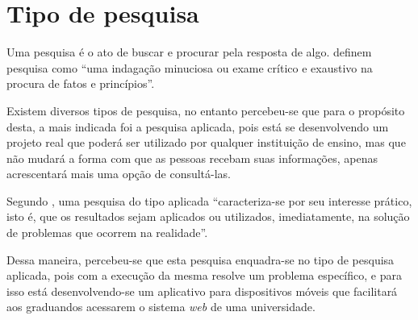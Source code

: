 \section{Tipo de pesquisa}
	
	\par Uma pesquisa é o ato de buscar e procurar pela resposta de algo.
 definem pesquisa como “uma indagação minuciosa
ou exame crítico e exaustivo na procura de fatos e princípios”.

	\par Existem diversos tipos de pesquisa, no entanto percebeu-se que para o
propósito desta, a mais indicada foi a pesquisa aplicada, pois está se
desenvolvendo um projeto real que poderá ser utilizado por qualquer instituição
de ensino, mas que não mudará a forma com que as pessoas recebam suas
informações, apenas acrescentará mais uma opção de consultá-las.

	\par Segundo , uma pesquisa do tipo aplicada
“caracteriza-se por seu interesse prático, isto é, que os resultados sejam
aplicados ou utilizados, imediatamente, na solução de problemas que ocorrem na
realidade”.

	\par Dessa maneira, percebeu-se que esta pesquisa enquadra-se no tipo de pesquisa
aplicada, pois com a execução da mesma resolve um problema específico, e para
isso está desenvolvendo-se um aplicativo para dispositivos móveis que facilitará aos
graduandos acessarem o sistema \textit{web} de uma universidade.